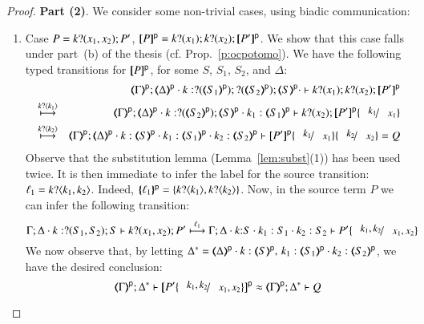 \begin{proof}
\noi \textbf{Part (2)}. We consider some non-trivial cases, using biadic communication:
\begin{enumerate}[1.]

\item Case $P =  k ? (x_1, x_2) ; P' $, 
$\map{P}^{\mathsf{p}} = 
		\binp{k}{x_1}  \binp{k}{x_2}  \map{P'}^{\mathsf{p}}$.
		We show that this case falls under part~(b) of the thesis (cf. Prop.~\ref{p:ocpotomo}). 		
		We have  the following typed transitions for $[\!\![P]\!\!]^{\mathsf{p}}$, for some $S$, $S_1$, $S_2$, and $\Delta$:
\begin{eqnarray*}
& & \mapt{\Gamma}^{\mathsf{p}}; 
\mapt{\Delta}^{\mathsf{p}} \cat 
k:\btinp{\tmap{S_1}{\mathsf{p}}}\btinp{\tmap{S_2}{\mathsf{p}}}\tmap{S}{\mathsf{p}} \cat
\proves 
\binp{k}{x_1} \binp{k}{x_2}\map{P'}^{\mathsf{p}} \\
& \hby{\bactinp{k}{k_1}} & 
\mapt{\Gamma}^{\mathsf{p}}; 
\mapt{\Delta}^{\mathsf{p}} \cat 
k:\btinp{\tmap{S_2}{\mathsf{p}}}\tmap{S}{\mathsf{p}} \cat
k_1:\mapt{S_1}^{\mathsf{p}}
\proves 
\binp{k}{x_2}\map{P'}^{\mathsf{p}} \subst{k_1}{x_1} \\
& \hby{\bactinp{k}{k_2}} & 
\mapt{\Gamma}^{\mathsf{p}}; 
\mapt{\Delta}^{\mathsf{p}} \cat k:\tmap{S}{\mathsf{p}} \cat
k_1:  \mapt{S_1}^{\mathsf{p}} \cat
k_2: \mapt{S_2}^{\mathsf{p}}
\proves 
\map{P'}^{\mathsf{p}} \subst{k_1}{x_1}\subst{k_2}{x_2} = Q
\end{eqnarray*}
Observe that the substitution lemma (Lemma~\ref{lem:subst}(1)) has been used twice.
It is then immediate to infer the label for the source transition:
$\ell_1 = k ? \langle k_1,k_2 \rangle$. Indeed, $\{\!\!\{\ell_1\}\!\!\}^{\mathsf{p}} = \{k ? \langle k_1 \rangle, k ? \langle k_2 \rangle\}$.
Now, in the source term $P$ we can infer the following transition:
$$
\stytra{\Gamma}{\ell_1}{\Delta \cat k:\btinp{S_1, S_2}S}{\binp{k}{x_1, x_2} P' }{\Delta\cat k{:}S \cat k_1:S_1 \cat k_2:S_2}{P'\subst{k_1,k_2}{x_1, x_2}}
$$
We now observe that, by
letting
 $\Delta^* = \mapt{\Delta}^{\mathsf{p}}\cat k:\tmap{S}{\mathsf{p}}, \,
k_1:  \mapt{S_1}^{\mathsf{p}} \cat
k_2: \mapt{S_2}^{\mathsf{p}}$, we have the desired conclusion:
$$\wbb{\mapt{\Gamma}^{\mathsf{p}}}{\ell}{\Delta^*}{\map{P'\subst{k_1,k_2}{x_1, x_2}}^{\mathsf{p}}}{\Delta^*}{Q}$$


\end{enumerate}
\end{proof}
